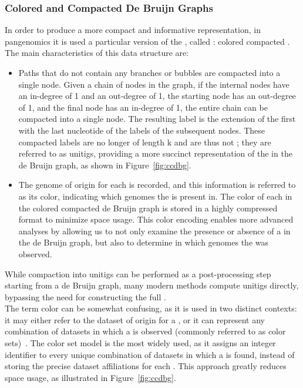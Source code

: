 \subsubsection{Colored and Compacted De Bruijn Graphs}
\label{sec:ccdbg}
In order to produce a more compact and informative representation, in pangenomics it is used a particular version of the \dbg, called \ccdbg: colored compacted \dbg. The main characteristics of this data structure are:
\begin{itemize}
	\item Paths that do not contain any branches or bubbles are compacted into a single node. Given a chain of nodes in the graph, if the internal nodes have an in-degree of 1 and an out-degree of 1, the starting node has an out-degree of 1, and the final node has an in-degree of 1, the entire chain can be compacted into a single node. The resulting label is the extension of the first \kmer with the last nucleotide of the labels of the subsequent nodes. These compacted labels are no longer of length k and are thus not \kmers; they are referred to as unitigs, providing a more succinct representation of the \kmers in the de Bruijn graph, as shown in Figure~\ref{fig:ccdbg}.
	\item The genome of origin for each \kmer is recorded, and this information is referred to as its color, indicating which genomes the \kmer is present in. The color of each \kmer in the colored compacted de Bruijn graph is stored in a highly compressed format to minimize space usage. This color encoding enables more advanced analyses by allowing us to not only examine the presence or absence of a \kmer in the de Bruijn graph, but also to determine in which genomes the \kmer was observed.
\end{itemize}
While \kmer compaction into unitigs can be performed as a post-processing step starting from a de Bruijn graph, many modern methods compute unitigs directly, bypassing the need for constructing the full \dbg.\\
The term color can be somewhat confusing, as it is used in two distinct contexts: it may either refer to the dataset of origin for a \kmer, or it can represent any combination of datasets in which a \kmer is observed (commonly referred to as color sets)~\cite{marchet_kmersets}. The color set model is the most widely used, as it assigns an integer identifier to every unique combination of datasets in which a \kmer is found, instead of storing the precise dataset affiliations for each \kmer. This approach greatly reduces space usage, as illustrated in Figure~\ref{fig:ccdbg}. 
